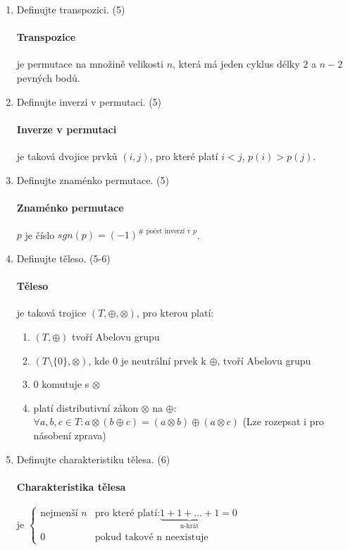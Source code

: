 \documentclass[10pt,a4paper]{article}
\begin{document}
\begin{enumerate}
\item Definujte transpozici. (5)

\paragraph{Transpozice} je permutace na množině velikosti $n$, která má jeden cyklus délky $2$ a $n-2$ pevných bodů.

\item Definujte inverzi v permutaci. (5)

\paragraph{Inverze v permutaci} je taková dvojice prvků $(i, j)$, pro které platí $i < j$, $p(i) > p(j)$.

\item Definujte znaménko permutace.  (5)

\paragraph{Znaménko permutace} $p$ je číslo $sgn(p) = (-1)^{\# \text{ počet inverzí v } p}$.

\item Definujte těleso. (5-6)

\paragraph{Těleso} je taková trojice $(T, \oplus, \otimes)$, pro kterou platí:

\begin{enumerate}
\item $(T, \oplus)$ tvoří Abelovu grupu
\item $(T \setminus \{0\}, \otimes)$, kde $0$ je neutrální prvek k $\oplus$, tvoří Abelovu grupu
\item $0$ komutuje s $\otimes$
\item platí distributivní zákon $\otimes$ na $\oplus$:
$\forall a,b,c \in T: a \otimes (b \oplus c) = (a \otimes b) \oplus (a \otimes c)$ 
(Lze rozepsat i pro násobení zprava)

\end{enumerate}

\item Definujte charakteristiku tělesa. (6)

\paragraph{Charakteristika tělesa} je $\begin{cases} 
\text{nejmenší } n & \text{pro které platí:} \underbrace{1+1+...+1}_{\text{n-krát}} = 0
\\ 0 & \text{pokud takové n neexistuje}
 \end{cases}$


\end{enumerate}
\end{document}
